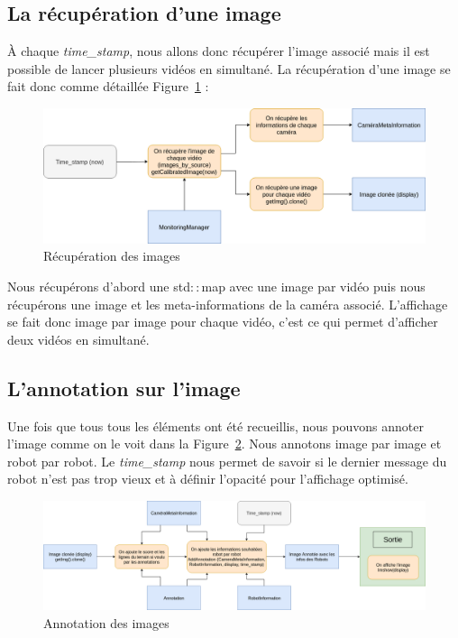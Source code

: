 \subsection{La récupération d'une image}

À chaque \textit{time\_stamp}, nous allons donc récupérer l'image
associé mais il est possible de lancer plusieurs vidéos en
simultané. La récupération d'une image se fait donc comme 
détaillée Figure~\ref{fig:img} : 

\begin{figure}[H] 
\centering 
\includegraphics[scale = 0.3]{images/getimage.png}
    \caption{Récupération des images}
    \label{fig:img}
\end{figure} 

Nous récupérons d'abord une std$::$map avec une image par
vidéo puis nous récupérons une image et les meta-informations
de la caméra associé. L'affichage se fait donc image par image
pour chaque vidéo, c'est ce qui permet d'afficher deux vidéos
en simultané.

\newpage

\subsection{L'annotation sur l'image}

Une fois que tous tous les éléments ont été recueillis, nous
pouvons annoter l'image comme on le voit dans la 
Figure~\ref{fig:annot}. Nous annotons image par image et robot
par robot. Le \textit{time\_stamp} nous permet de savoir si le
dernier message du robot n'est pas trop vieux et à définir
l'opacité pour l'affichage optimisé.

\begin{figure}[H] 
\centering 
\includegraphics[scale = 0.27]{images/annotation.png}
    \caption{Annotation des images}
    \label{fig:annot}
\end{figure} 

